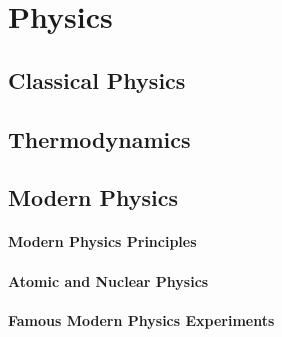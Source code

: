 	\section{Physics}
		\subsection{Classical Physics}
		\subsection{Thermodynamics}
		\subsection{Modern Physics}
			\paragraph{Modern Physics Principles}
			\paragraph{Atomic and Nuclear Physics}
			\paragraph{Famous Modern Physics Experiments}

